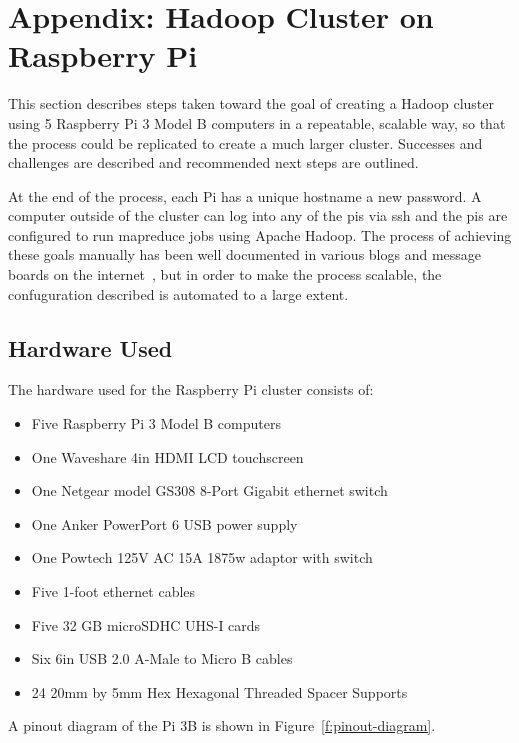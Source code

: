 
\section{Appendix: Hadoop Cluster on Raspberry Pi}\label{s:appendix}
This section describes steps taken toward the goal of creating a
Hadoop cluster using 5 Raspberry Pi 3 Model B computers in a
repeatable, scalable way, so that the process could be replicated to
create a much larger cluster. Successes and challenges are described
and recommended next steps are outlined.

At the end of the process, each Pi has a unique hostname a new
password. A computer outside of the cluster can log into any of the
pis via ssh and the pis are configured to run mapreduce jobs using
Apache Hadoop. The process of achieving these goals manually has been
well documented in various blogs and message boards on the
internet~\cite{hid-sp18-419-headless}, but in order to make the
process scalable, the confuguration described is automated to a large
extent.

\subsection{Hardware Used}

The hardware used for the Raspberry Pi cluster consists of:

\begin{itemize}
\item Five Raspberry Pi 3 Model B computers 
\item One Waveshare 4in HDMI LCD touchscreen
\item One Netgear model GS308 8-Port Gigabit ethernet switch
\item One Anker PowerPort 6 USB power supply
\item One Powtech 125V AC 15A 1875w adaptor with switch
\item Five 1-foot ethernet cables
\item Five 32 GB microSDHC UHS-I cards
\item Six 6in USB 2.0 A-Male to Micro B cables
\item 24 20mm by 5mm Hex Hexagonal Threaded Spacer Supports
\end{itemize}

A pinout diagram of the Pi 3B is shown in Figure~\ref{f:pinout-diagram}.

